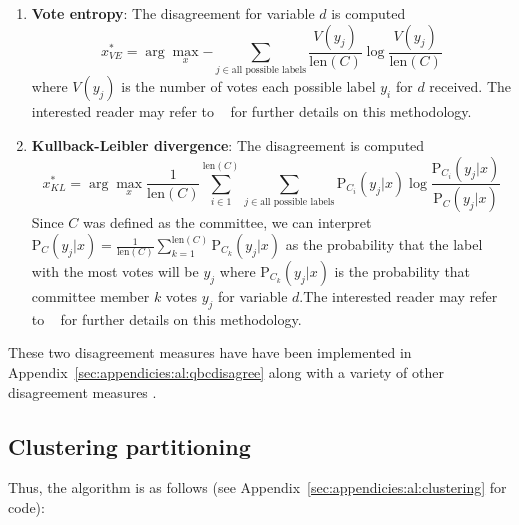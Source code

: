 \tablespacing
\begin{enumerate}
	\item \textbf{Vote entropy}: The disagreement for variable $d$ is computed  
	$$x^*_{VE}=\arg\max_x{-\sum\limits_{j \in \text{all possible labels}} 
	\frac{V(y_j)}{\text{len}(C)} \log \frac{V(y_j)}{\text{len}(C)}}$$
	\noindent where $V(y_j)$ is the number of votes each possible label $y_i$ 
	for $d$ received. The interested reader may refer to ~\cite{dagan1995} 
	for further details on this methodology.
	\item \textbf{Kullback-Leibler divergence}: The disagreement is computed
	$$x^*_{KL}=\arg\max_x{\frac{1}{\text{len}(C)} \sum\limits_{i \in 
	1}^{\text{len}(C)} \sum\limits_{j \in \text{all possible labels}} 
	\text{P}_{C_i}(y_j|x) \log \frac{\text{P}_{C_i}(y_j|x)}
	{\text{P}_{C}(y_j|x)}}$$
	\noindent Since	$C$ was defined as the committee, we can interpret 
	$\text{P}_{C}(y_j|x) = \frac{1}{\text{len}(C)} 
	\sum\limits_{k=1}^{\text{len}(C)} \text{P}_{C_k}(y_j|x)$ as the probability 
	that the label with the most votes will be $y_j$ where 
	$\text{P}_{C_k}(y_j|x)$ is the probability that committee member $k$ votes 
	$y_j$ for variable $d$.The interested reader may refer to 
	~\cite{mccallum1998} for further details on this methodology.
\end{enumerate}
\bodyspacing

\noindent These two disagreement measures have have been implemented in 
Appendix~\ref{sec:appendicies:al:qbcdisagree} along with a variety of other 
disagreement measures .








\subsection{Clustering partitioning}
\label{sec:al:methods:clustering}

Thus, the algorithm is as follows (see 
Appendix~\ref{sec:appendicies:al:clustering} for code):